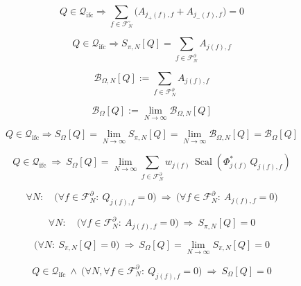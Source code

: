 \documentclass[12pt]{article}
\begin{document}
\begin{equation}
Q\in\mathcal{Q}_{\mathrm{ifc}}\Longrightarrow
\sum_{f\in\mathcal{F}_N^\circ}\Big(A_{j_+(f),f}+A_{j_-(f),f}\Big)=0
\end{equation}

\begin{equation}
Q\in\mathcal{Q}_{\mathrm{ifc}}\Longrightarrow
S_{\pi,N}[Q]=\sum_{f\in\mathcal{F}_N^\partial}A_{j(f),f}
\end{equation}

\begin{equation}
\mathcal{B}_{\Omega,N}[Q]
:=\sum_{f\in\mathcal{F}_N^\partial}A_{j(f),f}
\end{equation}

\begin{equation}
\mathcal{B}_{\Omega}[Q]
:=\lim_{N\to\infty}\mathcal{B}_{\Omega,N}[Q]
\end{equation}

\begin{equation}
Q\in\mathcal{Q}_{\mathrm{ifc}}\Longrightarrow
S_{\Omega}[Q]
=\lim_{N\to\infty}S_{\pi,N}[Q]
=\lim_{N\to\infty}\mathcal{B}_{\Omega,N}[Q]
=\mathcal{B}_{\Omega}[Q]
\end{equation}

\begin{equation}
\boxed{
Q\in\mathcal{Q}_{\mathrm{ifc}}\ \Longrightarrow\
S_\Omega[Q]
=\lim_{N\to\infty}\sum_{f\in\mathcal{F}_N^\partial} w_{j(f)}\,\operatorname{Scal}\!\left(\Phi_{j(f)}^*\,Q_{j(f),f}\right)
}
\end{equation}

\begin{equation}
\forall N:\quad \Big(\forall f\in\mathcal{F}_N^\partial:\ Q_{j(f),f}=0\Big)\ \Longrightarrow\ \Big(\forall f\in\mathcal{F}_N^\partial:\ A_{j(f),f}=0\Big)
\end{equation}

\begin{equation}
\forall N:\quad \Big(\forall f\in\mathcal{F}_N^\partial:\ A_{j(f),f}=0\Big)\ \Longrightarrow\ S_{\pi,N}[Q]=0
\end{equation}

\begin{equation}
\Big(\forall N:\ S_{\pi,N}[Q]=0\Big)\ \Longrightarrow\ S_\Omega[Q]=\lim_{N\to\infty}S_{\pi,N}[Q]=0
\end{equation}

\begin{equation}
\boxed{
Q\in\mathcal{Q}_{\mathrm{ifc}}\ \wedge\ \Big(\forall N,\forall f\in\mathcal{F}_N^\partial:\ Q_{j(f),f}=0\Big)\ \Longrightarrow\ S_\Omega[Q]=0
}
\end{equation}
\end{document}
